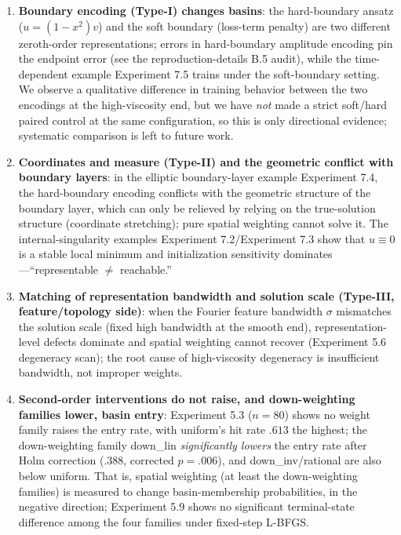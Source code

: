 \documentclass[11pt]{article}
\numberwithin{equation}{section}
\begin{document}
\begin{enumerate}[label=(\arabic*),leftmargin=2em,itemsep=1pt]
\item \textbf{Boundary encoding (Type-I) changes basins}: the hard-boundary ansatz ($u=(1-x^2)v$) and the soft boundary (loss-term penalty) are two different zeroth-order representations; errors in hard-boundary amplitude encoding pin the endpoint error (see the reproduction-details B.5 audit), while the time-dependent example Experiment 7.5 trains under the soft-boundary setting. We observe a qualitative difference in training behavior between the two encodings at the high-viscosity end, but we have \emph{not} made a strict soft/hard paired control at the same configuration, so this is only directional evidence; systematic comparison is left to future work.
\item \textbf{Coordinates and measure (Type-II) and the geometric conflict with boundary layers}: in the elliptic boundary-layer example Experiment 7.4, the hard-boundary encoding conflicts with the geometric structure of the boundary layer, which can only be relieved by relying on the true-solution structure (coordinate stretching); pure spatial weighting cannot solve it. The internal-singularity examples Experiment 7.2/Experiment 7.3 show that $u\equiv0$ is a stable local minimum and initialization sensitivity dominates---``representable $\neq$ reachable.''
\item \textbf{Matching of representation bandwidth and solution scale (Type-III, feature/topology side)}: when the Fourier feature bandwidth $\sigma$ mismatches the solution scale (fixed high bandwidth at the smooth end), representation-level defects dominate and spatial weighting cannot recover (Experiment 5.6 degeneracy scan); the root cause of high-viscosity degeneracy is insufficient bandwidth, not improper weights.
\item \textbf{Second-order interventions do not raise, and down-weighting families lower, basin entry}: Experiment 5.3 ($n=80$) shows no weight family raises the entry rate, with uniform's hit rate $.613$ the highest; the down-weighting family down\_lin \emph{significantly lowers} the entry rate after Holm correction ($.388$, corrected $p=.006$), and down\_inv/rational are also below uniform. That is, spatial weighting (at least the down-weighting families) is measured to change basin-membership probabilities, in the negative direction; Experiment 5.9 shows no significant terminal-state difference among the four families under fixed-step L-BFGS.
\end{enumerate}
\end{document}
